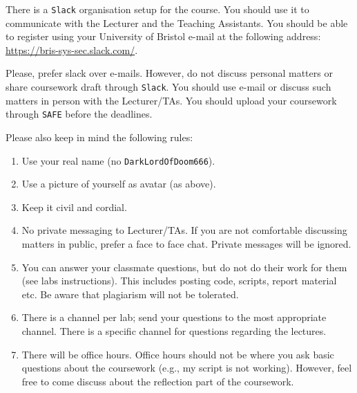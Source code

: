\documentclass[10pt]{article}
\begin{document}
\maketitle

There is a \texttt{Slack} organisation setup for the course.
You should use it to communicate with the Lecturer and the Teaching Assistants.
You should be able to register using your University of Bristol e-mail at the following address: \url{https://bris-sys-sec.slack.com/}.

Please, prefer slack over e-mails. 
However, do not discuss personal matters or share coursework draft through \texttt{Slack}.
You should use e-mail or discuss such matters in person with the Lecturer/TAs.
You should upload your coursework through \texttt{SAFE} before the deadlines.

\vspace{1cm}
Please also keep in mind the following rules:
\begin{enumerate}
	\itemsep0em
	\item Use your real name (no \texttt{DarkLordOfDoom666}).
	\item Use a picture of yourself as avatar (as above).
	\item Keep it civil and cordial.
	\item No private messaging to Lecturer/TAs. If you are not comfortable discussing matters in public, prefer a face to face chat.
	Private messages will be ignored.
	\item You can answer your classmate questions, but do not do their work for them (see labs instructions). This includes posting code, scripts, report material etc.
	Be aware that plagiarism will not be tolerated.
	\item There is a channel per lab; send your questions to the most appropriate channel. 
	There is a specific channel for questions regarding the lectures.
	\item There will be office hours. 
	Office hours should not be where you ask basic questions about the coursework (e.g., my script is not working).
	However, feel free to come discuss about the reflection part of the coursework.
\end{enumerate}
\end{document}
